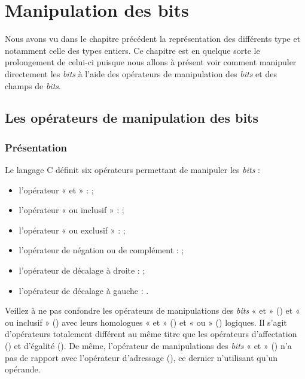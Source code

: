 \chapter{Manipulation des bits}
\label{manipulation-des-bits}

Nous avons vu dans le chapitre précédent la représentation des différents 
type et notamment celle des types entiers. Ce chapitre est en quelque sorte 
le prolongement de celui-ci puisque nous allons à présent voir comment 
manipuler directement les \emph{bits} à l'aide des opérateurs de manipulation
des \emph{bits} et des champs de \emph{bits}.

\section{Les opérateurs de manipulation des bits}
\label{les-operateurs-de-manipulation-des-bits}

\subsection{Présentation}
\label{presentation-6}

Le langage C définit six opérateurs permettant de manipuler les
\emph{bits} :

\begin{itemize}
\item
  l'opérateur « et » : \mybox{\&} ;
\item
  l'opérateur « ou inclusif » : \mybox{\textbar{}} ;
\item
  l'opérateur « ou exclusif » : \mybox{\^{}} ;
\item
  l'opérateur de négation ou de complément : \mybox{\textasciitilde{}}
  ;
\item
  l'opérateur de décalage à droite :
  \mybox{\textgreater{}\textgreater{}} ;
\item
  l'opérateur de décalage à gauche : \mybox{\textless{}\textless{}}.
\end{itemize}

\begin{erreurbox}
  Veillez à ne pas confondre les opérateurs
de manipulations des \emph{bits} « et » (\mybox{\&}) et « ou inclusif »
(\mybox{\textbar{}}) avec leurs homologues « et » (\mybox{\&\&}) et «
ou » (\mybox{\textbar{}\textbar{}}) logiques. Il s'agit d'opérateurs
totalement différent au même titre que les opérateurs d'affectation
(\mybox{=}) et d'égalité (\mybox{==}). De même, l'opérateur de
manipulations des \emph{bits} « et » (\mybox{\&}) n'a pas de rapport
avec l'opérateur d'adressage (\mybox{\&}), ce dernier n'utilisant qu'un
opérande.
\end{erreurbox}


